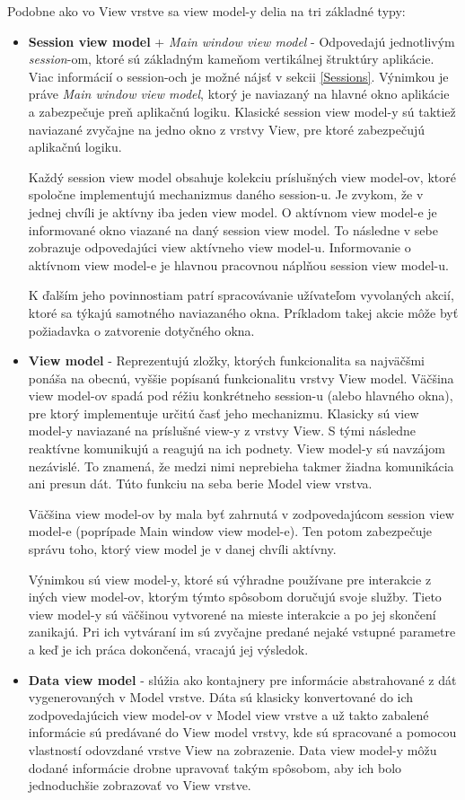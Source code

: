 Podobne ako vo View vrstve sa view model-y delia na tri základné typy:
\begin{itemize}
    \item \textbf{Session view model} + \textit{Main window view model} - Odpovedajú jednotlivým \textit{session}-om, ktoré sú základným kameňom vertikálnej štruktúry aplikácie. Viac informácií o session-och je možné nájsť v sekcii \ref{Sessions}. Výnimkou je práve \textit{Main window view model}, ktorý je naviazaný na hlavné okno aplikácie a zabezpečuje preň aplikačnú logiku. Klasické session view model-y sú taktiež naviazané zvyčajne na jedno okno z vrstvy View, pre ktoré zabezpečujú aplikačnú logiku.
    
    Každý session view model obsahuje kolekciu príslušných view model-ov, ktoré spoločne implementujú mechanizmus daného session-u. Je zvykom, že v jednej chvíli je aktívny iba jeden view model. O aktívnom view model-e je informované okno viazané na daný session view model. To následne v sebe zobrazuje odpovedajúci view aktívneho view model-u. Informovanie o aktívnom view model-e je hlavnou pracovnou náplňou session view model-u.

    K ďalším jeho povinnostiam patrí spracovávanie užívateľom vyvolaných akcií, ktoré sa týkajú samotného naviazaného okna. Príkladom takej akcie môže byť požiadavka o zatvorenie dotyčného okna.
    \item \textbf{View model} - Reprezentujú zložky, ktorých funkcionalita sa najväčšmi ponáša na obecnú, vyššie popísanú funkcionalitu vrstvy View model. Väčšina view model-ov spadá pod réžiu konkrétneho session-u (alebo hlavného okna), pre ktorý implementuje určitú časť jeho mechanizmu. Klasicky sú view model-y naviazané na príslušné view-y z vrstvy View. S tými následne reaktívne komunikujú a reagujú na ich podnety. View model-y sú navzájom nezávislé. To znamená, že medzi nimi neprebieha takmer žiadna komunikácia ani presun dát. Túto funkciu na seba berie Model view vrstva.

    Väčšina view model-ov by mala byť zahrnutá v zodpovedajúcom session view model-e (poprípade Main window view model-e). Ten potom zabezpečuje správu toho, ktorý view model je v danej chvíli aktívny. 
    
    Výnimkou sú view model-y, ktoré sú výhradne používane pre interakcie z iných view model-ov, ktorým týmto spôsobom doručujú svoje služby. Tieto view model-y sú väčšinou vytvorené na mieste interakcie a po jej skončení zanikajú. Pri ich vytváraní im sú zvyčajne predané nejaké vstupné parametre a keď je ich práca dokončená, vracajú jej výsledok. 
    \item \textbf{Data view model} - slúžia ako kontajnery pre informácie abstrahované z dát vygenerovaných v Model vrstve. Dáta sú klasicky konvertované do ich zodpovedajúcich view model-ov v Model view vrstve a už takto zabalené informácie sú predávané do View model vrstvy, kde sú spracované a pomocou vlastností odovzdané vrstve View na zobrazenie. Data view model-y môžu dodané informácie drobne upravovať takým spôsobom, aby ich bolo jednoduchšie zobrazovať vo View vrstve.
    

\end{itemize}
